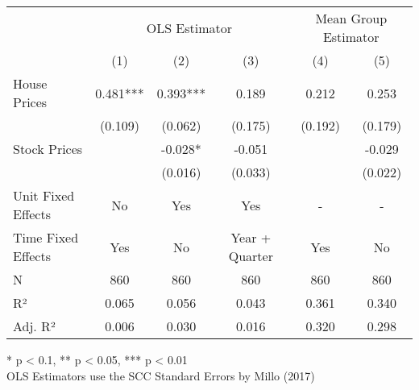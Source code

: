 \begin{table}[h]
\fontsize{9.0pt}{10.8pt}\selectfont
\begin{tabular*}{\linewidth}{@{\extracolsep{\fill}}lccccc}
\toprule
 & \multicolumn{3}{c}{OLS Estimator} & \multicolumn{2}{c}{Mean Group Estimator} \\ 
\cmidrule(lr){2-4} \cmidrule(lr){5-6}
  & (1) & (2) & (3) & (4) & (5) \\ 
\midrule\addlinespace[2.5pt]
House Prices & 0.481*** & 0.393*** & 0.189 & 0.212 & 0.253 \\ 
 & (0.109) & (0.062) & (0.175) & (0.192) & (0.179) \\ 
Stock Prices &  & -0.028* & -0.051 &  & -0.029 \\ 
{} & {} & {(0.016)} & {(0.033)} & {} & {(0.022)} \\ 
\midrule
Unit Fixed Effects & No & Yes & Yes & - & - \\ 
Time Fixed Effects & Yes & No & Year + Quarter & Yes & No \\ 
\midrule
{N} & {860} & {860} & {860} & {860} & {860} \\ 
R² & 0.065 & 0.056 & 0.043 & 0.361 & 0.340 \\ 
Adj. R² & 0.006 & 0.030 & 0.016 & 0.320 & 0.298 \\ 
\bottomrule
\end{tabular*}
\begin{minipage}{\linewidth}
* p < 0.1, ** p < 0.05, *** p < 0.01\\
OLS Estimators use the SCC Standard Errors by Millo (2017)\\
\end{minipage}
\end{table}

